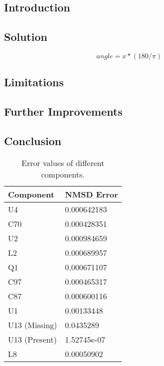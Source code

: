 \documentclass[conference]{IEEEtran}
\begin{document}
\subsection{Introduction}

\subsection{Solution}\label{2_solution}

\begin{equation}
angle = x*(180/\pi )
\end{equation}


\subsection{Limitations}\label{sec:t2_lim}

\subsection{Further Improvements}

\subsection{Conclusion}

\begin{table}[]
\caption{Error values of different components.}
\label{tab:t3error}
\begin{tabular}{|l|l|}
\hline
\textbf{Component} & \textbf{NMSD Error} \\ \hline
U4                 & 0.000642183         \\ \hline
C70                & 0.000428351         \\ \hline
U2                 & 0.000984659         \\ \hline
L2                 & 0.000689957         \\ \hline
Q1                 & 0.000671107         \\ \hline
C97                & 0.000465317         \\ \hline
C87                & 0.000600116         \\ \hline
U1                 & 0.00133448          \\ \hline
U13 (Missing)      & 0.0435289           \\ \hline
U13 (Present)      & 1.52745e-07         \\ \hline
L8                 & 0.00050902          \\ \hline
\end{tabular}
\end{table}
\end{document}
